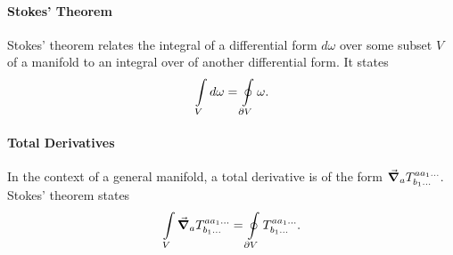\paragraph{Stokes' Theorem}
Stokes' theorem relates the integral of a differential form $d\omega$ over some subset $V$ of a manifold to an integral over  of another differential form.
It states
\begin{align*}
	\int\limits_{V}d\omega = \oint\limits_{\partial V}\omega.
\end{align*}

\paragraph{Total Derivatives}
In the context of a general manifold, a total derivative is of the form $\grad_{a}{T^{aa_{1}\dots}_{b_{1}\dots}}$. Stokes' theorem states
\begin{align*}
	\int\limits_{V}\grad_{a}{T^{aa_{1}\dots}_{b_{1}\dots}} = \oint\limits_{\partial V}T^{aa_{1}\dots}_{b_{1}\dots}.
\end{align*}